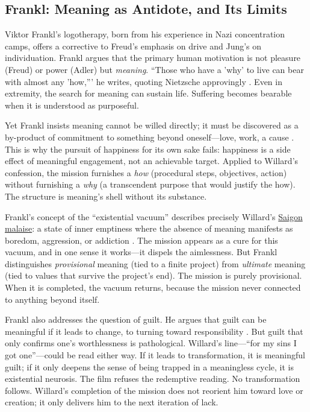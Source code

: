 \subsection*{Frankl: Meaning as Antidote, and Its Limits}
\label{ssec:vi-frankl}

Viktor Frankl's logotherapy, born from his experience in Nazi concentration camps, offers a
corrective to Freud's emphasis on drive and Jung's on individuation. Frankl argues that the
primary human motivation is not pleasure (Freud) or power (Adler) but \emph{meaning}.
``Those who have a 'why' to live can bear with almost any 'how,''' he writes, quoting
Nietzsche approvingly \parencite[p.~104]{FranklMeaning2006}. Even in extremity, the search
for meaning can sustain life. Suffering becomes bearable when it is understood as purposeful.

Yet Frankl insists meaning cannot be willed directly; it must be discovered as a by-product of
commitment to something beyond oneself---love, work, a cause
\parencite[pp.~110--115]{FranklMeaning2006}.
This is why the pursuit of happiness for its own sake fails: happiness is a side effect of
meaningful engagement, not an achievable target. Applied to Willard's confession, the mission
furnishes a \emph{how} (procedural steps, objectives, action) without furnishing a \emph{why}
(a transcendent purpose that would justify the how). The structure is meaning's shell without
its substance.

Frankl's concept of the ``existential vacuum'' describes precisely Willard's
\hyperref[scene:saigon-opening]{Saigon malaise}: a state of inner emptiness where the absence of
meaning manifests as boredom, aggression, or addiction
\parencite[pp.~127--129]{FranklMeaning2006}. The mission appears as a cure for this
vacuum, and in one sense it works---it dispels the aimlessness. But Frankl distinguishes
\emph{provisional} meaning (tied to a finite project) from \emph{ultimate} meaning (tied to
values that survive the project's end). The mission is purely provisional. When it is
completed, the vacuum returns, because the mission never connected to anything beyond itself.

Frankl also addresses the question of guilt. He argues that guilt can be meaningful if it
leads to change, to turning toward responsibility \parencite[pp.~131--133]{FranklMeaning2006}.
But guilt that only confirms one's worthlessness is pathological. Willard's line---``for my
sins I got one''---could be read either way. If it leads to transformation, it is meaningful
guilt; if it only deepens the sense of being trapped in a meaningless cycle, it is existential
neurosis. The film refuses the redemptive reading. No transformation follows. Willard's
completion of the mission does not reorient him toward love or creation; it only delivers him
to the next iteration of lack.

